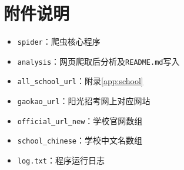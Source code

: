 \documentclass[logo,reportComp]{thesis}
\begin{document}
\section{附件说明}
\begin{itemize}
  \item \verb'spider'：爬虫核心程序
  \item \verb'analysis'：网页爬取后分析及\verb'README.md'写入
  \item \verb'all_school_url'：附录\ref{app:school}
  \item \verb'gaokao_url'：阳光招考网上对应网站
  \item \verb'official_url_new'：学校官网数组
  \item \verb'school_chinese'：学校中文名数组
  \item \verb'log.txt'：程序运行日志
\end{itemize}
\end{document}
